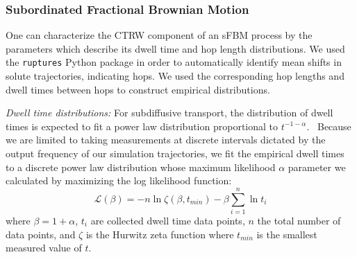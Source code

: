 \documentclass[journal=ancac3,manuscript=article,layout=twocolumn]{achemso}
\begin{document}
  \subsubsection{Subordinated Fractional Brownian Motion}\label{method:sfbm}

  One can characterize the CTRW component of an sFBM process by the parameters
  which describe its dwell time and hop length distributions. We used the
  \texttt{ruptures} Python package in order to automatically identify mean
  shifts in solute trajectories, indicating hops.\cite{truong_ruptures:_2018}
  We used the corresponding hop lengths and dwell times between hops to
  construct empirical distributions.
  
  \textit{Dwell time distributions:} For subdiffusive transport, the distribution 
  of dwell times is expected to fit a power law distribution 
  proportional to $t^{-1-\alpha}$.~\cite{meroz_toolbox_2015}
  Because we are limited to taking measurements at discrete intervals dictated by the output 
  frequency of our simulation trajectories, we fit the empirical dwell times
  to a discrete power law distribution whose maximum likelihood $\alpha$ 
  parameter we calculated by maximizing the log likelihood function: 
  \begin{equation}
	\mathcal{L}(\beta) = -n\ln \zeta(\beta, t_{min}) -
	\beta\sum_{i=1}^{n} \ln t_i 
  \label{eqn:powerlaw_likelihood}
  \end{equation}
  where $\beta = 1 + \alpha$, $t_i$ are collected dwell time data points,
  $n$ the total number of data points, and $\zeta$ is the Hurwitz zeta function
  where $t_{min}$ is the smallest measured value of $t$.~\cite{clauset_power-law_2009}
  
\end{document}
